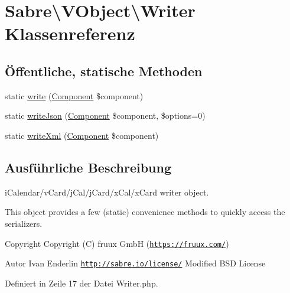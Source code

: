 \hypertarget{class_sabre_1_1_v_object_1_1_writer}{}\section{Sabre\textbackslash{}V\+Object\textbackslash{}Writer Klassenreferenz}
\label{class_sabre_1_1_v_object_1_1_writer}
\subsection*{Öffentliche, statische Methoden}
\begin{DoxyCompactItemize}
\item 
static \mbox{\hyperlink{class_sabre_1_1_v_object_1_1_writer_a4d963d7f0ccff8230c8978804ef6c976}{write}} (\mbox{\hyperlink{class_sabre_1_1_v_object_1_1_component}{Component}} \$component)
\item 
static \mbox{\hyperlink{class_sabre_1_1_v_object_1_1_writer_ab3b3ef7e3ff4346ac0cc22afc11ef605}{write\+Json}} (\mbox{\hyperlink{class_sabre_1_1_v_object_1_1_component}{Component}} \$component, \$options=0)
\item 
static \mbox{\hyperlink{class_sabre_1_1_v_object_1_1_writer_ac12097b74fb8c21a7d446414d163ba4c}{write\+Xml}} (\mbox{\hyperlink{class_sabre_1_1_v_object_1_1_component}{Component}} \$component)
\end{DoxyCompactItemize}


\subsection{Ausführliche Beschreibung}
i\+Calendar/v\+Card/j\+Cal/j\+Card/x\+Cal/x\+Card writer object.

This object provides a few (static) convenience methods to quickly access the serializers.

\begin{DoxyCopyright}{Copyright}
Copyright (C) fruux GmbH (\href{https://fruux.com/}{\tt https\+://fruux.\+com/}) 
\end{DoxyCopyright}
\begin{DoxyAuthor}{Autor}
Ivan Enderlin  \href{http://sabre.io/license/}{\tt http\+://sabre.\+io/license/} Modified B\+SD License 
\end{DoxyAuthor}


Definiert in Zeile 17 der Datei Writer.\+php.



